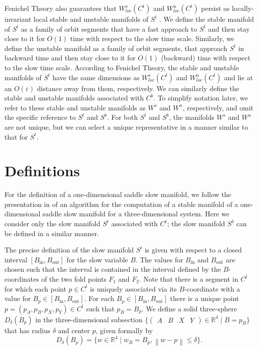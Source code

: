 \documentclass{ws-ijbc}
\begin{document}
Fenichel Theory also guarantees that $W^{s}_{loc}(C^t)$ and $W^{u}_{loc}(C^t)$ persist as locally-invariant local stable and unstable manifolds of $S^t$ \cite{Fenichel}.  We define the stable manifold of $S^t$ as a family of orbit segments that have a fast approach to $S^t$ and then stay close to it for $O(1)$ time with respect to the slow time scale.  Similarly, we define the unstable manifold as a family of orbit segments, that approach $S^t$ in backward time and then stay close to it for $O(1)$ (backward) time with respect to the slow time scale.  According to Fenichel Theory, the stable and unstable manifolds of $S^t$ have the same dimensions as $W^{s}_{loc}(C^t)$ and $W^{u}_{loc}(C^t)$ and lie at an $O(\varepsilon)$ distance away from them, respectively.  We can similarly define the stable and unstable manifolds associated with $C^b$.  To simplify notation later, we refer to these stable and unstable manifolds as $W^s$ and $W^u$, respectively, and omit the specific reference to $S^t$ and $S^b$.  For both $S^t$ and $S^b$, the manifolds $W^s$ and $W^u$ are not unique, but we can select a unique representative in a manner similar to that for $S^t$.
 
 \section{Definitions}
    
For the definition of a one-dimensional saddle slow manifold, we follow the presentation in \cite{Saeed_Paper} of an algorithm for the computation of a stable manifold of a one-dimensional saddle slow manifold for a three-dimensional system.  Here we consider only the slow manifold $S^t$ associated with $C^t$; the slow manifold $S^b$ can be defined in a similar manner.
    
The precise definition of the slow manifold $S^t$ is given with respect to a closed interval $[B_{\mathrm{in}},B_{\mathrm{out}}]$ for the slow variable $B$.  The values for $B_{\mathrm{in}}$ and $B_{\mathrm{out}}$ are chosen such that the interval is contained in the interval defined by the $B$-coordinates of the two fold points $F_1$ and $F_2$.  Note that there is a segment in $C^t$ for which each point $p \in C^t$ is uniquely associated via its $B$-coordinate with a value for $B_p \in [B_{\mathrm{in}},B_{\mathrm{out}}]$.  For each $B_p \in [B_{\mathrm{in}},B_{\mathrm{out}}]$ there is a unique point $p=(p_A,p_B,p_X,p_Y) \in C^t$ such that $p_B = B_p$.  We define a solid three-sphere $D_\delta(B_p)$ in the three-dimensional subsection $\{ \begin{pmatrix} A & B & X & Y \end{pmatrix} \in \mathbb{R}^4 \; | \; B=p_B\}$ that has radius $\delta$ and center $p$, given formally by
\begin{equation*}
D_\delta(B_p)=\{w \in \mathbb{R}^4 \; | \; w_B = B_p, \left\lVert w-p \right\rVert \leq \delta\}.
\end{equation*}
    
\end{document}
